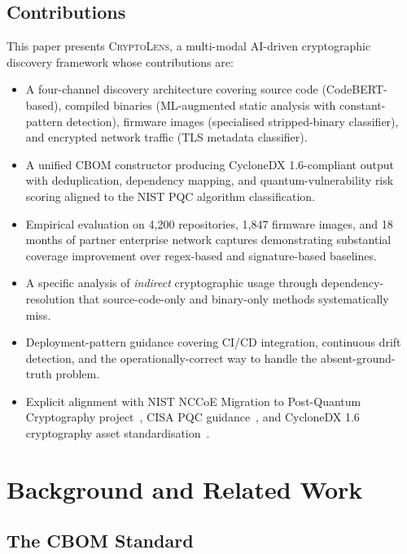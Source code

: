 \documentclass[sigconf,nonacm]{acmart}
\begin{document}
\subsection{Contributions}

This paper presents \textsc{CryptoLens}, a multi-modal AI-driven
cryptographic discovery framework whose contributions are:

\begin{itemize}
  \item A four-channel discovery architecture covering source code
        (CodeBERT-based), compiled binaries (ML-augmented static
        analysis with constant-pattern detection), firmware images
        (specialised stripped-binary classifier), and encrypted
        network traffic (TLS metadata classifier).
  \item A unified CBOM constructor producing CycloneDX 1.6-compliant
        output with deduplication, dependency mapping, and
        quantum-vulnerability risk scoring aligned to the NIST PQC
        algorithm classification.
  \item Empirical evaluation on 4{,}200 repositories, 1{,}847 firmware
        images, and 18 months of partner enterprise network captures
        demonstrating substantial coverage improvement over
        regex-based and signature-based baselines.
  \item A specific analysis of \emph{indirect} cryptographic usage
        through dependency-resolution that source-code-only and
        binary-only methods systematically miss.
  \item Deployment-pattern guidance covering CI/CD integration,
        continuous drift detection, and the operationally-correct way
        to handle the absent-ground-truth problem.
  \item Explicit alignment with NIST NCCoE Migration to Post-Quantum
        Cryptography project~\cite{nccoe2024cryptodisc}, CISA PQC
        guidance~\cite{cisa2024pqc}, and CycloneDX 1.6
        cryptography asset standardisation~\cite{cyclonedx2024crypto}.
\end{itemize}

\section{Background and Related Work}

\subsection{The CBOM Standard}
\end{document}
